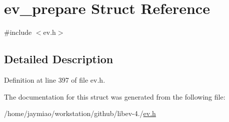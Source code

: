 \hypertarget{structev__prepare}{\section{ev\-\_\-prepare \-Struct \-Reference}
\label{structev__prepare}
}


{\ttfamily \#include $<$ev.\-h$>$}



\subsection{\-Detailed \-Description}


\-Definition at line 397 of file ev.\-h.



\-The documentation for this struct was generated from the following file\-:\begin{DoxyCompactItemize}
\item 
/home/jaymiao/workstation/github/libev-\/4./\hyperlink{ev_8h}{ev.\-h}\end{DoxyCompactItemize}
